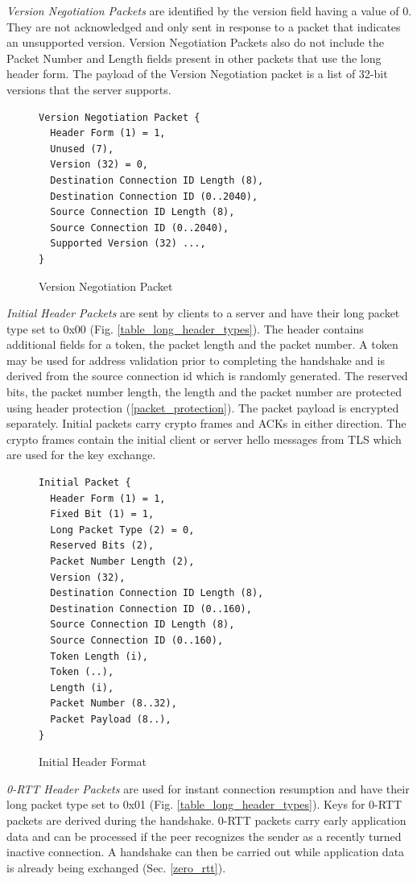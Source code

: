 \textit{Version Negotiation Packets} are identified by the version field having a value of 0. They are not acknowledged and only sent in response to a packet that indicates an unsupported version. Version Negotiation Packets also do not include the Packet Number and Length fields present in other packets that use the long header form. The payload of the Version Negotiation packet is a list of 32-bit versions that the server supports.
\begin{figure}[htb]
\begin{verbatim}
Version Negotiation Packet {
  Header Form (1) = 1,
  Unused (7),
  Version (32) = 0,
  Destination Connection ID Length (8),
  Destination Connection ID (0..2040),
  Source Connection ID Length (8),
  Source Connection ID (0..2040),
  Supported Version (32) ...,
}
\end{verbatim}
    \caption{Version Negotiation Packet\cite[91]{rfc9000}}
\end{figure}

\textit{Initial Header Packets} are sent by clients to a server and have their long packet type set to 0x00 (Fig. \ref{table_long_header_types}). The header contains additional fields for a token, the packet length and the packet number. A token may be used for address validation prior to completing the handshake and is derived from the source connection id which is randomly generated. The reserved bits, the packet number length, the length and the packet number are protected using header protection (\ref{packet_protection}). The packet payload is encrypted separately. Initial packets carry crypto frames and ACKs in either direction. The crypto frames contain the initial client or server hello messages from TLS which are used for the key exchange\cite{rfc9001}.

\begin{figure}[htb]
    \centering      
\begin{verbatim}
Initial Packet {
  Header Form (1) = 1,
  Fixed Bit (1) = 1,
  Long Packet Type (2) = 0,
  Reserved Bits (2),
  Packet Number Length (2),
  Version (32),
  Destination Connection ID Length (8),
  Destination Connection ID (0..160),
  Source Connection ID Length (8),
  Source Connection ID (0..160),
  Token Length (i),
  Token (..),
  Length (i),
  Packet Number (8..32),
  Packet Payload (8..),
}
\end{verbatim}
    \caption{Initial Header Format\cite[92]{rfc9000}}
\end{figure}

\textit{0-RTT Header Packets} are used for instant connection resumption and have their long packet type set to 0x01 (Fig. \ref{table_long_header_types}). Keys for 0-RTT packets are derived during the handshake. 0-RTT packets carry early application data and can be processed if the peer recognizes the sender as a recently turned inactive connection. A handshake can then be carried out while application data is already being exchanged (Sec. \ref{zero_rtt}). 

